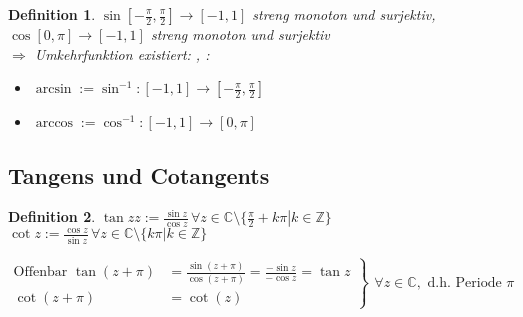 \documentclass[ngerman,a4paper]{report}
\theoremstyle{break}
\newtheorem*{definition}{Definition}
\begin{document}
\begin{definition}
	$\sin\left[ -\frac{\pi}{2},\frac{\pi}{2}\right]\to [-1,1]$ streng monoton und surjektiv,\\
	$\cos[0,\pi]\to[-1,1]$ streng monoton und surjektiv\\
	$\Rightarrow$ Umkehrfunktion existiert: , :
	\begin{itemize}
		\item $\arcsin := \sin^{-1}: [-1,1]\to\left[-\frac{\pi}{2},\frac{\pi}{2}\right]$
		\item $\arccos := \cos^{-1}: [-1,1]\to [0,\pi]$
	\end{itemize}
\end{definition}

\subsection*{Tangens und Cotangents}
\begin{definition}
	$\tan z z := \frac{\sin z}{\cos z}\,\forall z\in\mathbb{C}\setminus\{ \left.\frac{\pi}{2} + k\pi \right| k\in\mathbb{Z}\}$\\
	$\cot z := \frac{\cos z}{\sin z}\,\forall z\in\mathbb{C}\setminus \{ k\pi | k\in\mathbb{Z}\}$
	
	$\left.\begin{aligned}
		\text{Offenbar }\tan (z+\pi) &= \frac{\sin (z+\pi)}{\cos(z+\pi)} = \frac{-\sin z}{-\cos z} = \tan z\\
		\cot(z+\pi) &= \cot (z)
	\end{aligned}\right\rbrace
	\begin{gathered}
		\forall z\in\mathbb{C}, \text{ d.h. Periode $\pi$}
	\end{gathered}
	$
\end{definition}
\end{document}
